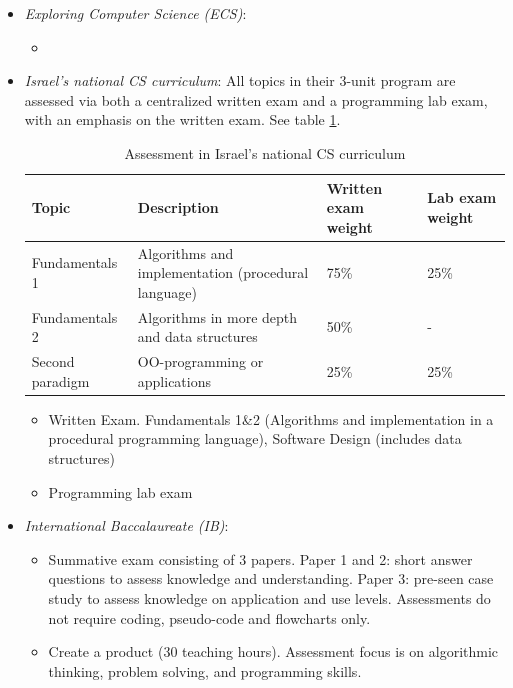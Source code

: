 \begin{itemize}
\item \emph{Exploring Computer Science (ECS)}:
    \begin{itemize}
    \item
    \end{itemize}


\item \emph{Israel's national CS curriculum}:
    All topics in their 3-unit program are assessed via both a centralized written exam and a programming lab exam, with an emphasis on the written exam.\cite{ezer1999curriculum} See table \ref{table:IsraelAssessment}.

\begin{table}
  \centering
\begin{tabular}{|l|p{70mm}|p{20mm}|p{20mm}|}
  \hline

  \textbf{Topic} & \textbf{Description} & \textbf{Written exam weight} &  \textbf{Lab exam weight} \\
  \hline
Fundamentals 1 & Algorithms and implementation (procedural language)& 75\% & 25\% \\ \hline
Fundamentals 2 & Algorithms in more depth and data structures & 50\% & - \\ \hline
Second paradigm & OO-programming or applications & 25\% & 25\% \\ \hline
  \hline
\end{tabular}
\caption{Assessment in Israel's national CS curriculum}\label{table:IsraelAssessment}
\end{table}



    \begin{itemize}
    \item Written Exam. Fundamentals 1\&2 (Algorithms and implementation in a procedural programming language), Software Design (includes data structures)
    \item Programming lab exam
    \end{itemize}

\item \emph{International Baccalaureate (IB)}:
    \begin{itemize}
    \item Summative exam consisting of 3 papers. Paper 1 and 2: short answer questions to assess knowledge and understanding.
	Paper 3: pre-seen case study to assess knowledge on application and use levels. Assessments do not require coding, pseudo-code and flowcharts only.

    \item Create a product (30 teaching hours). Assessment focus is on algorithmic thinking, problem solving, and programming skills.


\end{itemize}
\end{itemize}
